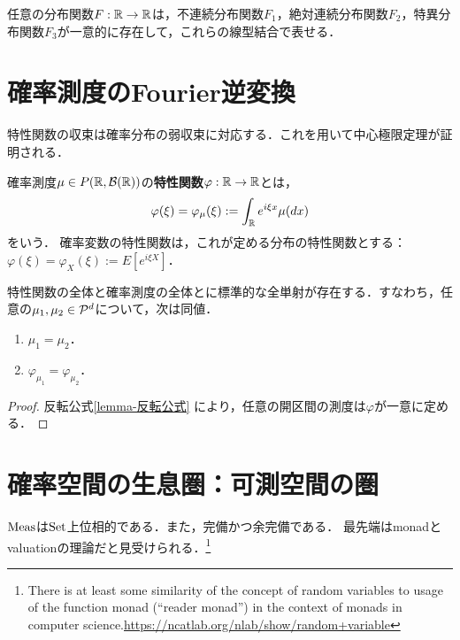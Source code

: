 \documentclass[uplatex,dvipdfmx]{jsreport}
\begin{document}
\begin{theorem}
    任意の分布関数$F:\R\to\R$は，不連続分布関数$F_1$，絶対連続分布関数$F_2$，特異分布関数$F_3$が一意的に存在して，これらの線型結合で表せる．
\end{theorem}

\section{確率測度のFourier逆変換}

\begin{tcolorbox}[colframe=ForestGreen, colback=ForestGreen!10!white,breakable,colbacktitle=ForestGreen!40!white,coltitle=black,fonttitle=\bfseries\sffamily,
title=]
    特性関数の収束は確率分布の弱収束に対応する．これを用いて中心極限定理が証明される．
\end{tcolorbox}

\begin{definition}
    確率測度$\mu\in P(\R,\B(\R))$の\textbf{特性関数}$\varphi:\R\to\R$とは，
    \[\varphi(\xi)=\varphi_\mu(\xi):=\int_\R e^{i\xi x}\mu(dx)\]
    をいう．
    確率変数の特性関数は，これが定める分布の特性関数とする：$\varphi(\xi)=\varphi_X(\xi):=E[e^{i\xi X}]$．
\end{definition}

\begin{theorem}[一意性定理]
    特性関数の全体と確率測度の全体とに標準的な全単射が存在する．すなわち，任意の$\mu_1,\mu_2\in\P^d$について，次は同値．
    \begin{enumerate}
        \item $\mu_1=\mu_2$．
        \item $\varphi_{\mu_1}=\varphi_{\mu_2}$．
    \end{enumerate}
\end{theorem}
\begin{proof}
    反転公式\ref{lemma-反転公式}
    により，任意の開区間の測度は$\varphi$が一意に定める．
\end{proof}

\section{確率空間の生息圏：可測空間の圏}

\begin{tcolorbox}[colframe=ForestGreen, colback=ForestGreen!10!white,breakable,colbacktitle=ForestGreen!40!white,coltitle=black,fonttitle=\bfseries\sffamily,
title=]
    $\Meas$は$\Set$上位相的である．また，完備かつ余完備である．
    最先端はmonadとvaluationの理論だと見受けられる．\footnote{There is at least some similarity of the concept of random variables to usage of the function monad (“reader monad”) in the context of monads in computer science.\url{https://ncatlab.org/nlab/show/random+variable}}
\end{tcolorbox}
\end{document}
